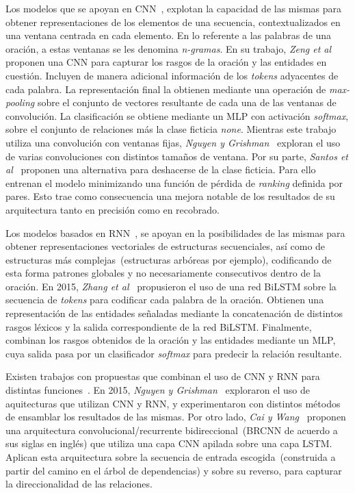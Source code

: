 Los modelos que se apoyan en CNN~\cite{zeng2014relation, santos2015classifying, nguyen2015relation, xu2015semantic, huang2016attention, wang2016relation}, explotan la capacidad de las mismas para obtener representaciones de los elementos de una secuencia, contextualizados en una ventana centrada en cada elemento. En lo referente a las palabras de una oración, a estas ventanas se les denomina \textit{n-gramas}.
En su trabajo, \textit{Zeng et al}~\cite{zeng2014relation} proponen una CNN para capturar los rasgos de la oración y las entidades en cuestión.
Incluyen de manera adicional información de los \textit{tokens} adyacentes de cada palabra.
La representación final la obtienen mediante una operación de \textit{max-pooling} sobre el conjunto de vectores resultante de cada una de las ventanas de convolución.
La clasificación se obtiene mediante un MLP con activación \textit{softmax}, sobre el conjunto de relaciones más la clase ficticia \textit{none}.
Mientras este trabajo utiliza una convolución con ventanas fijas, \textit{Nguyen y Grishman}~\cite{nguyen2015relation} exploran el uso de varias convoluciones con distintos tamaños de ventana.
Por su parte, \textit{Santos et al}~\cite{santos2015classifying} proponen una alternativa para deshacerse de la clase ficticia.
Para ello entrenan el modelo minimizando una función de pérdida de \textit{ranking} definida por pares.
Esto trae como consecuencia una mejora notable de los resultados de su arquitectura tanto en precisión como en recobrado.

Los modelos basados en RNN~\cite{socher2012semantic, xu2015classifying, zhang2015bidirectional, ebrahimi2015chain, xiao2016semantic, lee2019semantic}, se apoyan en la posibilidades de las mismas para obtener representaciones vectoriales de estructuras secuenciales, así como de estructuras más complejas~(estructuras arbóreas por ejemplo), codificando de esta forma patrones globales y no necesariamente consecutivos dentro de la oración.
En 2015, \textit{Zhang et al}~\cite{zhang2015bidirectional} propusieron el uso de una red BiLSTM sobre la secuencia de \textit{tokens} para codificar cada palabra de la oración.
Obtienen una representación de las entidades señaladas mediante la concatenación de distintos rasgos léxicos y la salida correspondiente de la red BiLSTM.
Finalmente, combinan los rasgos obtenidos de la oración y las entidades mediante un MLP, cuya salida pasa por un clasificador \textit{softmax} para predecir la relación resultante.

Existen trabajos con propuestas que combinan el uso de CNN y RNN para distintas funciones~\cite{liu2015dependency, nguyen2015combining, cai2016bidirectional}.
En 2015, \textit{Nguyen y Grishman}~\cite{nguyen2015combining} exploraron el uso de aquitecturas que utilizan CNN y RNN, y experimentaron con distintos métodos de ensamblar los resultados de las mismas.
Por otro lado, \textit{Cai y Wang}~\cite{cai2016bidirectional} proponen una arquitectura convolucional/recurrente bidireccional~(BRCNN de acuerdo a sus siglas en inglés) que utiliza una capa CNN apilada sobre una capa LSTM.
Aplican esta arquitectura sobre la secuencia de entrada escogida~(construida a partir del camino en el árbol de dependencias) y sobre su reverso, para capturar la direccionalidad de las relaciones.

